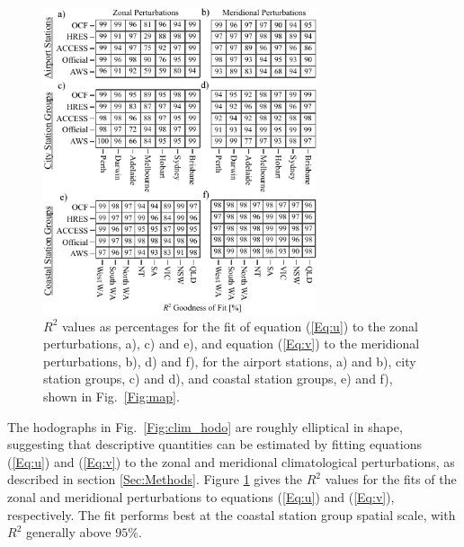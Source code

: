 \documentclass[twocol]{ametsoc}
\begin{document}
\begin{figure}
\centering
\includegraphics[width=19pc]{r_squared.pdf}
\caption{$R^2$ values as percentages for the fit of equation (\ref{Eq:u}) to the zonal perturbations, a), c) and e), and equation (\ref{Eq:v}) to the meridional perturbations, b), d) and f), for the airport stations, a) and b), city station groups, c) and d), and coastal station groups, e) and f), shown in Fig.~\ref{Fig:map}.}
\label{Fig:r_squared}
\end{figure}

The hodographs in Fig.~\ref{Fig:clim_hodo} are roughly elliptical in shape, suggesting that descriptive quantities can be estimated by fitting equations (\ref{Eq:u}) and (\ref{Eq:v}) to the zonal and meridional climatological perturbations, as described in section \ref{Sec:Methods}. Figure \ref{Fig:r_squared} gives the $R^2$ values for the fits of the zonal and meridional perturbations to equations (\ref{Eq:u}) and (\ref{Eq:v}), respectively. The fit performs best at the coastal station group spatial scale, with $R^2$ generally above $95\%$. 
\end{document}

